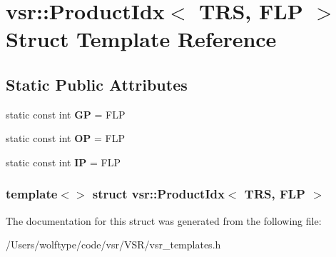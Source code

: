 \hypertarget{structvsr_1_1_product_idx_3_01_t_r_s_00_01_f_l_p_01_4}{\section{vsr\-:\-:Product\-Idx$<$ T\-R\-S, F\-L\-P $>$ Struct Template Reference}
\label{structvsr_1_1_product_idx_3_01_t_r_s_00_01_f_l_p_01_4}
}
\subsection*{Static Public Attributes}
\begin{DoxyCompactItemize}
\item 
\hypertarget{structvsr_1_1_product_idx_3_01_t_r_s_00_01_f_l_p_01_4_aab6a0c5a2cc0589a5c20362a97b17977}{static const int {\bfseries G\-P} = F\-L\-P}\label{structvsr_1_1_product_idx_3_01_t_r_s_00_01_f_l_p_01_4_aab6a0c5a2cc0589a5c20362a97b17977}

\item 
\hypertarget{structvsr_1_1_product_idx_3_01_t_r_s_00_01_f_l_p_01_4_a4554bea845fb8268432aa3d9375a1041}{static const int {\bfseries O\-P} = F\-L\-P}\label{structvsr_1_1_product_idx_3_01_t_r_s_00_01_f_l_p_01_4_a4554bea845fb8268432aa3d9375a1041}

\item 
\hypertarget{structvsr_1_1_product_idx_3_01_t_r_s_00_01_f_l_p_01_4_aefde6a7d0f3c4b2559c08b39b46c26d6}{static const int {\bfseries I\-P} = F\-L\-P}\label{structvsr_1_1_product_idx_3_01_t_r_s_00_01_f_l_p_01_4_aefde6a7d0f3c4b2559c08b39b46c26d6}

\end{DoxyCompactItemize}
\subsubsection*{template$<$$>$ struct vsr\-::\-Product\-Idx$<$ T\-R\-S, F\-L\-P $>$}



The documentation for this struct was generated from the following file\-:\begin{DoxyCompactItemize}
\item 
/\-Users/wolftype/code/vsr/\-V\-S\-R/vsr\-\_\-templates.\-h\end{DoxyCompactItemize}
